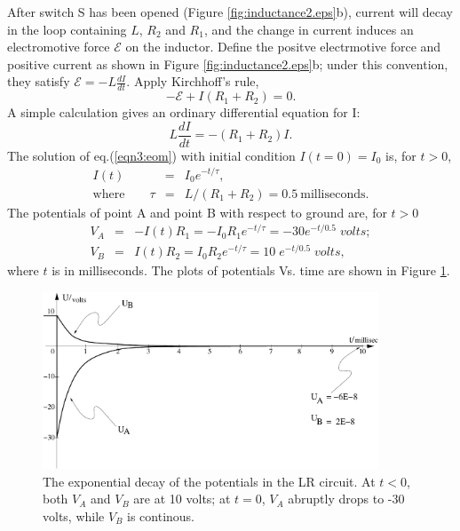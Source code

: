 \documentclass[makesolutionspdf]{esg8022pset}
\begin{document}
\begin{solution}
  After switch S has been opened (Figure \ref{fig:inductance2.eps}b),
  current will decay in the loop containing $L$, $R_2$ and $R_1$, and
  the change in current induces an electromotive force $\mathcal{E}$ on
  the inductor.  Define the positve electrmotive force and positive
  current as shown in Figure \ref{fig:inductance2.eps}b; under this
  convention, they satisfy ${\mathcal{E}}=-L\frac{dI}{dt}$.  Apply
  Kirchhoff's rule,
  \begin{equation}
  -{\mathcal{E}}+I(R_1+R_2)=0.
  \end{equation}
  A simple calculation gives an ordinary differential equation for I:
  \begin{equation}\label{eqn3:eom}
  L\frac{dI}{dt}=-(R_1+R_2)I.
  \end{equation}
  The solution of eq.(\ref{eqn3:eom}) with initial condition
  $I(t=0)=I_0$ is, for $t>0$,
  \begin{eqnarray}
  I(t) &=& I_0 e^{-t/\tau},\\
  \textrm{where}\qquad \tau &=& L/(R_1+R_2)=0.5\: \textrm{milliseconds}.
  \end{eqnarray}
  The potentials of point A and point B with respect to ground are, for $t>0$
  \begin{eqnarray}
  V_A &=& -I(t)R_1=-I_0 R_1 e^{-t/\tau}= -30e^{-t/0.5}\;volts;\\
  V_B &=& I(t)R_2=I_0 R_2 e^{-t/\tau}= 10\;e^{-t/0.5}\;volts,
  \end{eqnarray}
  where $t$ is in milliseconds.  The plots of potentials Vs. time are
  shown in Figure \ref{fig:graph22.eps}.


  \begin{figure}[H]
    \centering
    \includegraphics[width = 10cm]{graph22}
    \caption{The exponential decay of the potentials in the LR circuit.
At $t<0$, both $V_A$ and $V_B$ are at 10 volts; at $t=0$, $V_A$
abruptly drops to -30 volts, while $V_B$ is continous.}
    \label{fig:graph22.eps}
  \end{figure}



\end{solution}
\end{document}
